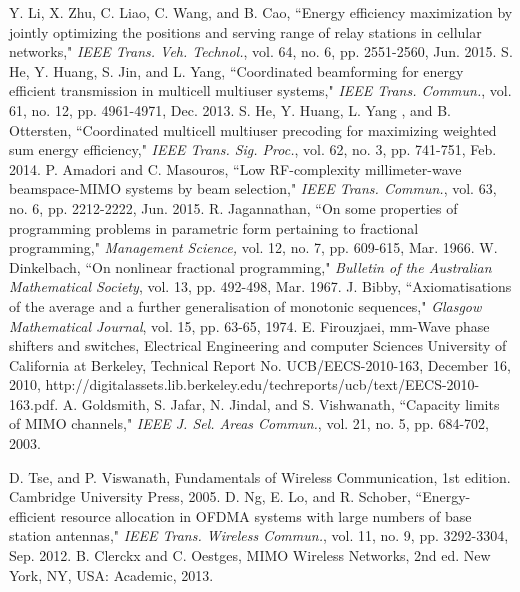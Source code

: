 \documentclass[11pt,draftcls,onecolumn]{IEEEtran}
\begin{document}
\begin{small}
\begin{thebibliography}{30}
Y. Li, X. Zhu, C. Liao, C. Wang, and B. Cao, ``Energy efficiency maximization by jointly optimizing the positions and serving range of relay stations in cellular networks," \emph{IEEE Trans. Veh. Technol.}, vol. 64, no. 6, pp. 2551-2560, Jun. 2015.
S. He, Y. Huang, S. Jin, and L. Yang, ``Coordinated beamforming for energy efficient transmission in multicell multiuser systems," \emph{IEEE Trans. Commun.}, vol. 61, no. 12, pp. 4961-4971, Dec. 2013.
S. He, Y. Huang, L. Yang , and B. Ottersten, ``Coordinated multicell multiuser precoding for maximizing weighted sum energy efficiency," \emph{IEEE Trans. Sig. Proc.}, vol. 62, no. 3, pp. 741-751, Feb. 2014.
P. Amadori and C. Masouros, ``Low RF-complexity millimeter-wave beamspace-MIMO systems by beam selection," \emph{IEEE Trans. Commun.}, vol. 63, no. 6, pp. 2212-2222, Jun. 2015.
R. Jagannathan, ``On some properties of programming problems in parametric form pertaining to fractional programming," \emph{Management Science,} vol. 12, no. 7, pp. 609-615, Mar. 1966.
W. Dinkelbach, ``On nonlinear fractional programming," \emph{Bulletin of the Australian Mathematical Society}, vol. 13, pp. 492-498, Mar. 1967.
J. Bibby, ``Axiomatisations of the average and a further generalisation of monotonic sequences," \emph{Glasgow Mathematical Journal}, vol. 15, pp. 63-65, 1974.
E. Firouzjaei, mm-Wave phase shifters and switches, Electrical Engineering and computer Sciences University of California at Berkeley, Technical Report No. UCB/EECS-2010-163, December 16, 2010, http://digitalassets.lib.berkeley.edu/techreports/ucb/text/EECS-2010-163.pdf.
A. Goldsmith, S. Jafar, N. Jindal, and S. Vishwanath, ``Capacity limits of MIMO channels," \emph{IEEE J. Sel. Areas Commun.}, vol. 21, no. 5, pp. 684-702, 2003.

D. Tse, and P. Viswanath, Fundamentals of Wireless Communication, 1st edition. Cambridge University Press, 2005.
D. Ng, E. Lo, and R. Schober, ``Energy-efficient resource allocation in OFDMA systems with large numbers of base station antennas," \emph{IEEE Trans. Wireless Commun.}, vol. 11, no. 9, pp. 3292-3304, Sep. 2012.
B. Clerckx and C. Oestges, MIMO Wireless Networks, 2nd ed. New York, NY, USA: Academic, 2013.


\end{thebibliography}
\end{small}
\end{document}
